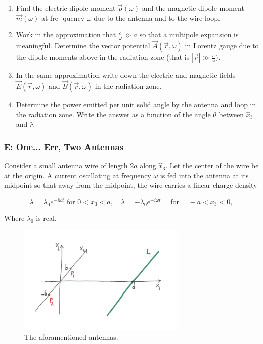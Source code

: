\begin{enumerate}
	\item  Find the electric dipole moment $\vec{p}(\omega)$ and the magnetic dipole moment $\vec{m}(\omega)$ at fre-
	quency $\omega$ due to the antenna and to the wire loop.
	\item  Work in the approximation that $\frac{c}{\omega} \gg a$ so that a multipole expansion is meaningful. Determine the vector potential $\vec{A}(\vec{r}, \omega)$ in Lorentz gauge due to the dipole moments above in the radiation zone (that is $\left|\vec{r}\right| \gg \frac{c}{\omega})$.
	\item In the same approximation write down the electric and magnetic fields $\vec{E}(\vec{r}, \omega)$ and $\vec{B}(\vec{r}, \omega)$ in the radiation zone.
	\item Determine the power emitted per unit solid angle by the antenna and loop in the radiation zone. Write the answer as a function of the angle $\theta$ between $\hat{x}_{3}$ and $\hat{r}$.
\end{enumerate}

\subsubsection{\hyperref[E: One... Err, Two Antennas]{E: One... Err, Two Antennas}}

Consider a small antenna wire of length $2 a$ along $\hat{x}_{3} .$ Let the center of the wire be at the origin. A current oscillating at frequency $\omega$ is fed into the antenna at its midpoint so that away from the midpoint, the wire carries a linear charge density

\begin{equation}
	\lambda=\lambda_{0} e^{-i \omega t} \text { for } 0<x_{3}<a, \quad \lambda=-\lambda_{0} e^{-i \omega t} \quad \text { for } \quad-a<x_{3}<0,
\end{equation}

Where $\lambda_{0}$ is real.

\begin{figure}[h]
	\includegraphics[width=8cm]{figures/examdec19p2.png}
	\centering
	\caption{The aforamentioned antennas.}
\end{figure}

